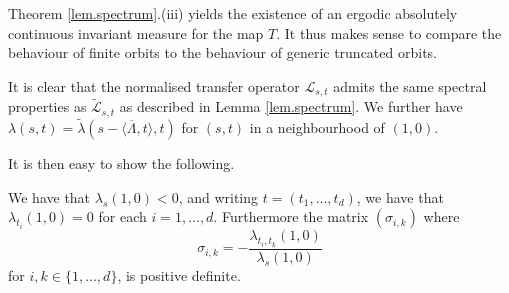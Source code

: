 \documentclass[12pt,a4paper,reqno]{amsart}
\newcommand{\tcb}{\textcolor{blue}}
\begin{document}
\begin{remark} \label{rem:acim}
Theorem \ref{lem.spectrum}.(iii)  yields the existence of an  ergodic absolutely continuous  invariant  measure for the  map $T$.
 It thus makes sense to compare  the behaviour of  finite orbits to the behaviour of generic  truncated orbits.
\end{remark}





\begin{remark}
It is clear that the normalised transfer operator $\mathcal{L}_{s,t}$ admits the same spectral properties as $\widetilde{\mathcal{L}}_{s,t}$ as described in Lemma \ref{lem.spectrum}. We further have 
 ${\lambda}(s,t)= \widetilde{\lambda}(s- \langle  \overline{\Lambda}, t \rangle,t)$ for $(s,t)$ in a neighbourhood of $(1,0)$.
\end{remark}
 It is then easy to show the following. %
\begin{lemma}\label{lem.deriv}
We have that $\lambda_s(1,0) < 0$, and writing $t = (t_1,\ldots, t_d)$, we have that
$\lambda_{t_i}(1,0) = 0$ for each $i=1,\ldots, d$.
Furthermore the matrix $(\sigma_{i,k})$ where
\[
\sigma_{i,k} = -\frac{\lambda_{t_i,t_k}(1,0)}{\lambda_s(1,0)} 
\]
 for $i,k \in \{1,\ldots,d\}$,
is positive definite.
\end{lemma}
\end{document}
